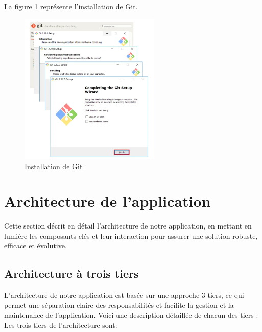 \documentclass[12pt]{report}
\begin{document}
			La figure \ref{fig:git} représente l’installation de Git.
			
			\begin{figure}[h]
				\centering
				\includegraphics[width=0.6\textwidth]{git.png}
				\caption{Installation de Git}
				\label{fig:git}
			\end{figure}
			\FloatBarrier


			\section{Architecture de l’application}

			\hspace{15pt} Cette section décrit en détail l'architecture de notre application, en mettant en lumière les composants clés et leur interaction pour assurer une solution robuste, efficace et évolutive.

			\subsection{Architecture à trois tiers}
	
			\hspace{15pt} L'architecture de notre application est basée sur une approche 3-tiers, ce qui permet une séparation claire des responsabilités et facilite la gestion et la maintenance de l'application. Voici une description détaillée de chacun des tiers :\\

			Les trois tiers de l'architecture sont:
\end{document}
